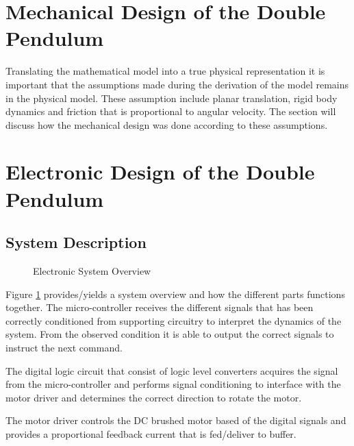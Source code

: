 \documentclass[a4paper,12pt]{article}
\begin{document}
	\section{Mechanical Design of the Double Pendulum}
	
	Translating the mathematical model into a true physical representation it is important that the assumptions made during the derivation of the model remains in the physical model. These assumption include planar translation, rigid body dynamics and friction that is proportional to angular velocity. The section will discuss how the mechanical design was done according to these assumptions.
	
	\newpage
	\section{Electronic Design of the Double Pendulum}
	
	\subsection{System Description}
	
	\begin{figure}[h]
		\centering
		
		\caption{Electronic System Overview}
		\label{fig:electronicSystemOverview}
	\end{figure}
	
	
	Figure \ref{fig:electronicSystemOverview} provides/yields a system overview and how the different parts functions together. The micro-controller receives the different signals that has been correctly conditioned from supporting circuitry to interpret the dynamics of the system. From the observed condition it is able to output the correct signals to instruct the next command.
	
	The digital logic circuit that consist of logic level converters acquires the signal from the micro-controller and performs signal conditioning to interface with the motor driver and determines the correct direction to rotate the motor. 
	
	The motor driver controls the DC brushed motor based of the digital signals and provides a proportional feedback current that is fed/deliver to buffer.
	
\end{document}
